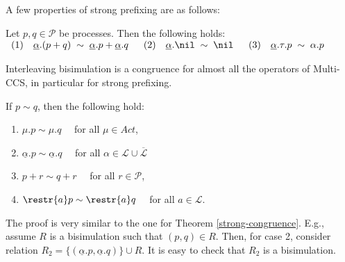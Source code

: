 

A few properties of strong prefixing are as follows:

\begin{proposition}\label{prop}
Let $p, q \in {\mathcal P}$ be processes. Then the following holds:\\

$\begin{array}{lllllr}
(1) & \underline\alpha.(p + q)  \; \sim \;   \underline\alpha.p +  \underline\alpha.q & \; \;
(2) &  \underline\alpha.\nil  \; \sim \;   \nil & \; \;
(3) &  \underline\alpha.\tau.p   \; \sim \;  \alpha.p \\
\end{array}
$\\[-.8cm]

\fine
\end{proposition}


Interleaving bisimulation is a congruence for almost all the operators of Multi-CCS, in particular for strong prefixing.

\begin{proposition}
If $p \sim q$, then the following hold:
\begin{enumerate}
\item  $\mu.p \sim \mu.q \quad$ for all $\mu \in Act$,
\item $\underline{\alpha}.p \sim \underline{\alpha}.q \quad$ for all $\alpha \in \mathcal{L}\cup\overline{\mathcal{L}}$
\item $p + r \sim q + r \quad $ for all  $r \in \mathcal{P}$,
\item $\restr{a}p \sim \restr{a}q \quad$ for all $a \in \mathcal{L}$.
\end{enumerate}

\proof
The proof is very similar to the one for Theorem \ref{strong-congruence}. E.g., 
assume $R$ is a bisimulation such that $(p, q) \in R$.
Then, for case 2,  consider relation $R_2 = \{(\underline\alpha.p, \underline\alpha.q)\} \cup R$. 
It is easy to check that $R_2$ is a bisimulation.
\fine
\end{proposition}

